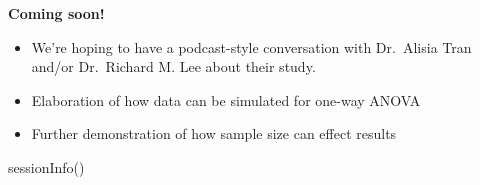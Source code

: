 \documentclass[
  english,
]{book}
\newenvironment{Shaded}{\begin{snugshade}}{\end{snugshade}}
\newcommand{\FunctionTok}[1]{\textcolor[rgb]{0.00,0.00,0.00}{#1}}
\newcommand{\NormalTok}[1]{#1}
\providecommand{\tightlist}{%
  \setlength{\itemsep}{0pt}\setlength{\parskip}{0pt}}
\begin{document}
\textbf{Coming soon!}

\begin{itemize}
\tightlist
\item
  We're hoping to have a podcast-style conversation with Dr.~Alisia Tran and/or Dr.~Richard M. Lee about their study.
\item
  Elaboration of how data can be simulated for one-way ANOVA
\item
  Further demonstration of how sample size can effect results
\end{itemize}

\begin{Shaded}
\begin{Highlighting}[]
\FunctionTok{sessionInfo}\NormalTok{()}
\end{Highlighting}
\end{Shaded}
\end{document}

